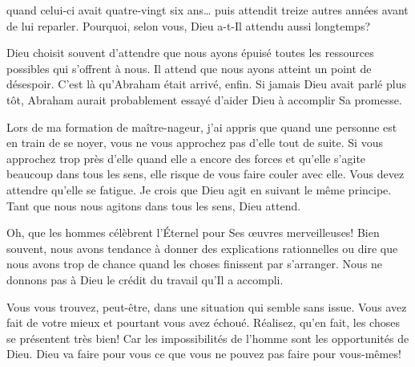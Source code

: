  quand celui-ci avait quatre-vingt
 six ans\dots{} puis attendit treize autres années avant de lui reparler.
 Pourquoi, selon vous, Dieu a-t-Il attendu aussi longtemps? 

Dieu choisit souvent d'attendre que nous ayons épuisé toutes les ressources
 possibles qui s'offrent à nous.
 Il attend que nous ayons atteint un point de désespoir.
 C'est là qu'Abraham était arrivé, enfin.
 Si jamais Dieu avait parlé plus tôt, Abraham aurait probablement essayé
 d'aider Dieu à accomplir Sa promesse. 

Lors de ma formation de maître-nageur, j'ai appris que quand une personne
 est en train de se noyer, vous ne vous approchez pas d'elle tout de suite.
 Si vous approchez trop près d'elle quand elle a encore des forces
 et qu'elle s'agite beaucoup dans tous les sens,
 elle risque de vous faire couler avec elle.
 Vous devez attendre qu'elle se fatigue.
 Je crois que Dieu agit en suivant le même principe.
 Tant que nous nous agitons dans tous les sens, Dieu attend. 


\og Oh, que les hommes célèbrent l'Éternel pour
 Ses œuvres merveilleuses! \fg{}
 Bien souvent, nous avons tendance à donner des explications rationnelles
 ou dire que nous avons trop de chance quand les choses finissent
 par s'arranger.
 Nous ne donnons pas à Dieu le crédit du travail qu'Il a accompli. 

Vous vous trouvez, peut-être, dans une situation qui semble sans issue.
 Vous avez fait de votre mieux et pourtant vous avez échoué.
 Réalisez, qu'en fait, les choses se présentent très bien!
 Car les impossibilités de l'homme sont les opportunités de Dieu.
 Dieu va faire pour vous ce que vous ne pouvez pas faire pour vous-mêmes! 

\dvrule






